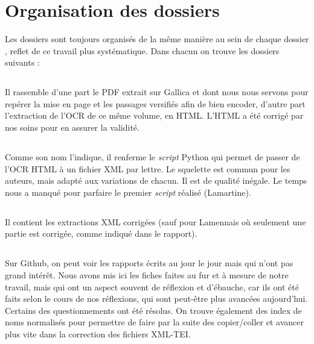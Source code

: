 \section{Organisation des dossiers}

Les dossiers sont toujours organisés de la même manière au sein de chaque dossier , reflet de ce travail plus systématique.
Dans chacun on trouve les dossiers suivants :

\subsection{}

Il rassemble d'une part le PDF extrait sur Gallica et dont nous nous servons pour repérer la mise en page et les passages versifiés afin de bien encoder, d'autre part l'extraction de l'OCR de ce même volume, en HTML. L'HTML a été corrigé par nos soins pour en assurer la validité.


\subsection{}

Comme son nom l'indique, il renferme le \emph{script} Python qui permet de passer de l'OCR HTML à un fichier XML par lettre. Le squelette est commun pour les auteurs, mais adapté aux variations de chacun.
Il est de qualité inégale. Le temps nous a manqué pour parfaire le premier \emph{script} réalisé (Lamartine).


\subsection{}

Il contient les extractions XML corrigées (sauf pour Lamennais où seulement une partie est corrigée, comme indiqué dans le rapport).

\subsection{}
Sur Github, on peut voir les rapports écrits au jour le jour mais qui n'ont pas grand intérêt. 
Nous avons mis ici les fiches faites au fur et à mesure de notre travail, mais qui ont un aspect souvent de réflexion et d'ébauche, car ils ont été faits selon le cours de nos réflexions, qui sont peut-être plus avancées aujourd'hui. Certains des questionnements ont été résolus.
On trouve également des index de noms normalisés pour permettre de faire par la suite des copier/coller et avancer plus vite dans la correction des fichiers XML-TEI.
